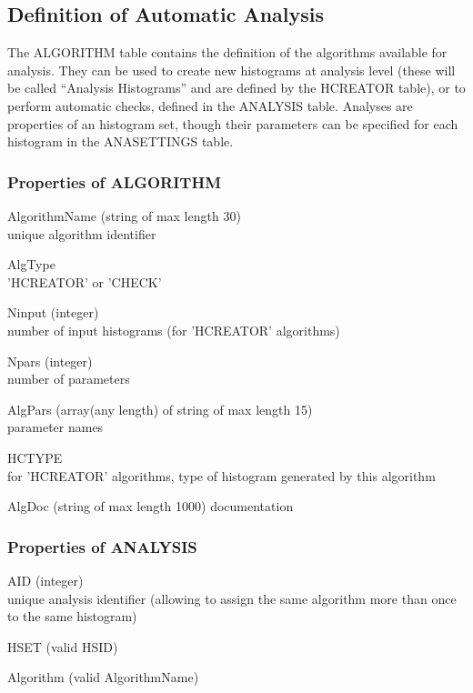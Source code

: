 \documentclass{lhcbnote}
\begin{document}
\subsection{Definition of Automatic Analysis}
The ALGORITHM table contains the definition of the algorithms
available for analysis. They can be used to create new histograms at
analysis level (these will be called ``Analysis Histograms'' and are
defined by the HCREATOR table), or to perform automatic checks,
defined in the ANALYSIS table. Analyses are properties of an histogram
set, though their parameters can be specified for each histogram in
the ANASETTINGS table.

\subsubsection{Properties of ALGORITHM}
\begin{description}
\item{AlgorithmName} (string of max length 30)\\
unique algorithm identifier
\item{AlgType} \\
'HCREATOR' or 'CHECK'
\item{Ninput} (integer)\\
number of input histograms (for 'HCREATOR' algorithms)
\item{Npars} (integer)\\
number of parameters
\item{AlgPars} (array(any length) of string of max length 15)\\
parameter names
\item{HCTYPE}\\
for 'HCREATOR' algorithms, type of histogram generated by this algorithm 
\item{AlgDoc} (string of max length 1000)
documentation

\end{description}

\subsubsection{Properties of ANALYSIS}
\begin{description}
\item{AID} (integer)\\
unique analysis identifier (allowing to assign the same algorithm more
than once to the same histogram)
\item{HSET}  (valid HSID)
\item{Algorithm}  (valid AlgorithmName)
\end{description}
\end{document}
